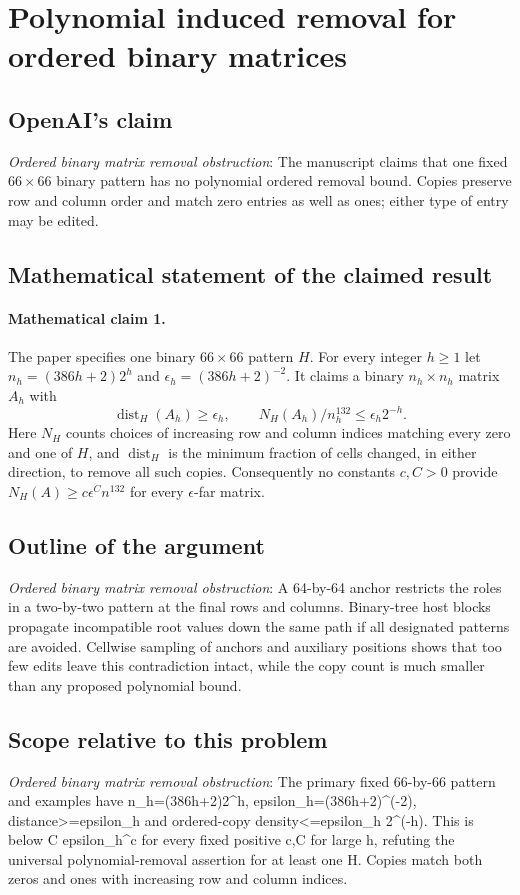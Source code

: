 \documentclass[11pt]{article}
\begin{document}
\section*{Polynomial induced removal for ordered binary matrices}

\subsection{OpenAI's claim}
\textit{Ordered binary matrix removal obstruction}: The manuscript claims that one fixed $66\times66$ binary pattern has no polynomial ordered removal bound. Copies preserve row and column order and match zero entries as well as ones; either type of entry may be edited.

\subsection{Mathematical statement of the claimed result}
\paragraph{Mathematical claim 1.} The paper specifies one binary $66\times66$ pattern $H$. For every integer $h\ge1$ let $n_h=(386h+2)2^h$ and $\epsilon_h=(386h+2)^{-2}$. It claims a binary $n_h\times n_h$ matrix $A_h$ with \[\operatorname{dist}_H(A_h)\ge\epsilon_h,\qquad N_H(A_h)/n_h^{132}\le\epsilon_h2^{-h}.\] Here $N_H$ counts choices of increasing row and column indices matching every zero and one of $H$, and $\operatorname{dist}_H$ is the minimum fraction of cells changed, in either direction, to remove all such copies. Consequently no constants $c,C>0$ provide $N_H(A)\ge c\epsilon^Cn^{132}$ for every $\epsilon$-far matrix.

\subsection{Outline of the argument}
\textit{Ordered binary matrix removal obstruction}: A 64-by-64 anchor restricts the roles in a two-by-two pattern at the final rows and columns. Binary-tree host blocks propagate incompatible root values down the same path if all designated patterns are avoided. Cellwise sampling of anchors and auxiliary positions shows that too few edits leave this contradiction intact, while the copy count is much smaller than any proposed polynomial bound.

\subsection{Scope relative to this problem}
\textit{Ordered binary matrix removal obstruction}: The primary fixed 66-by-66 pattern and examples have n\_h=(386h+2)2\textasciicircum{}h, epsilon\_h=(386h+2)\textasciicircum{}(-2), distance>=epsilon\_h and ordered-copy density<=epsilon\_h 2\textasciicircum{}(-h). This is below C epsilon\_h\textasciicircum{}c for every fixed positive c,C for large h, refuting the universal polynomial-removal assertion for at least one H. Copies match both zeros and ones with increasing row and column indices.
\end{document}
